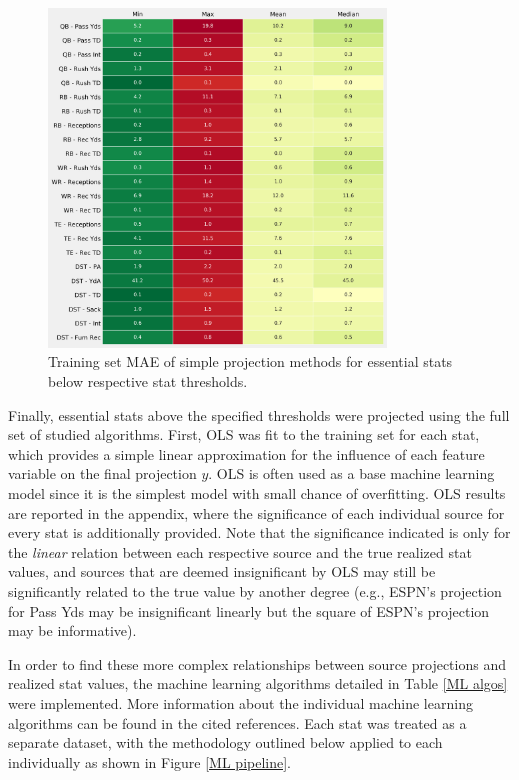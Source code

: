 \documentclass[12pt]{article}
\begin{document}
\begin{figure}[H]
  \centering
  \includegraphics[width=0.8\textwidth]{../figures/essential_thresh_MAE_table}
  \caption{Training set MAE of simple projection methods for essential stats below respective stat thresholds.}
\end{figure}

Finally, essential stats above the specified thresholds were projected using the full set of studied algorithms. First, OLS was fit to the training set for each stat, which provides a simple linear approximation for the influence of each feature variable on the final projection $y$. OLS is often used as a base machine learning model since it is the simplest model with small chance of overfitting. OLS results are reported in the appendix, where the significance of each individual source for every stat is additionally provided. Note that the significance indicated is only for the \textit{linear} relation between each respective source and the true realized stat values, and sources that are deemed insignificant by OLS may still be significantly related to the true value by another degree (e.g., ESPN's projection for Pass Yds may be insignificant linearly but the square of ESPN's projection may be informative).\bigskip

In order to find these more complex relationships between source projections and realized stat values, the machine learning algorithms detailed in Table \ref{ML algos} were implemented. More information about the individual machine learning algorithms can be found in the cited references. Each stat was treated as a separate dataset, with the methodology outlined below applied to each individually as shown in Figure \ref{ML pipeline}.\bigskip
\end{document}

